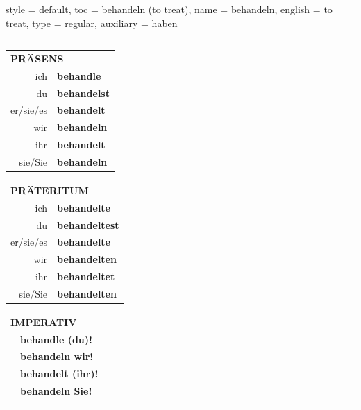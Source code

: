 \begin{verbentry}{
  style = {default},
  toc = {behandeln (to treat)},
  name = {behandeln},
  english = {to treat},
  type = {regular},
  auxiliary = {haben}
}
 
    
     \vspace{5pt}

    \hrule
    
    \vspace{5pt}

  \begin{tabular}{rl}
     \multicolumn{2}{l}{\textbf{PRÄSENS} }\\
    ich & \textbf{behandle}\\
    du & \textbf{behandelst}\\
    er/sie/es & \textbf{behandelt}\\
    wir & \textbf{behandeln}\\
    ihr & \textbf{behandelt}\\
    sie/Sie & \textbf{behandeln}\\
  \end{tabular}
  \hfill
     \begin{tabular}{rl}
    \multicolumn{2}{l}{\textbf{PRÄTERITUM} }\\
    ich & \textbf{behandelte}\\
    du & \textbf{behandeltest}\\
    er/sie/es & \textbf{behandelte}\\
    wir & \textbf{behandelten}\\
    ihr & \textbf{behandeltet}\\
    sie/Sie & \textbf{behandelten}\\
  \end{tabular}
  \hfill
  \begin{tabular}{rl}
     \multicolumn{2}{l}{\textbf{IMPERATIV} }\\
   & \textbf{behandle (du)!}\\
   & \textbf{behandeln wir!}\\
   & \textbf{behandelt (ihr)!}\\
   & \textbf{behandeln Sie!}\\
   & \vspace{10pt}
  \end{tabular}

    \vspace{10pt}


\end{verbentry}
